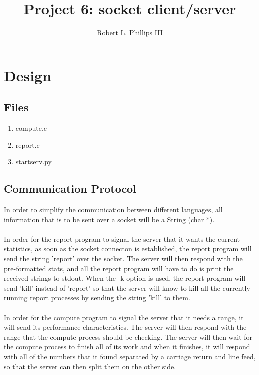 \documentclass{article}
\begin{document}
\title{Project 6:  socket client/server}
\author{Robert L. Phillips III}
\maketitle
\newpage
\tableofcontents
\newpage

\section{Design}
\subsection{Files}
\begin{enumerate}
\item compute.c
\item report.c
\item startserv.py
\end{enumerate}

\subsection{Communication Protocol}
In order to simplify the communication between different languages, all information that is to be sent over a socket will be a String (char *). \\\\

In order for the report program to signal the server that it wants the current statistics, as soon as the socket connecton is established, the report program will send the string 'report' over the socket.  The server will then respond with the pre-formatted stats, and all the report program will have to do is print the received strings to stdout. When the -k option is used, the report program will send 'kill' instead of 'report' so that the server will know to kill all the currently running report processes by sending the string 'kill' to them. \\\\

In order for the compute program to signal the server that it needs a range, it will send its performance characteristics.  The server will then respond with the range that the compute process should be checking.  The server will then wait for the compute process to finish all of its work and when it finishes, it will respond with all of the numbers that it found separated by a carriage return and line feed, so that the server can then split them on the other side.
\end{document}
